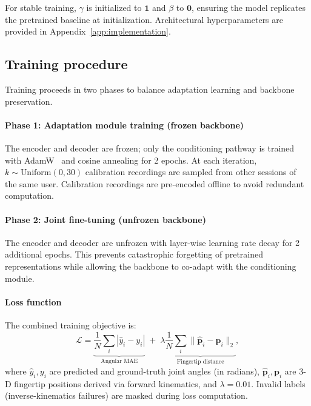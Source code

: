 \documentclass[conference]{IEEEtran}
\begin{document}
For stable training, $\gamma$ is initialized to $\mathbf{1}$ and $\beta$ to $\mathbf{0}$, ensuring the model replicates the pretrained baseline at initialization. Architectural hyperparameters are provided in Appendix~\ref{app:implementation}.

\subsection{Training procedure}
\label{sec:training}

Training proceeds in two phases to balance adaptation learning and backbone preservation.

\paragraph{Phase 1: Adaptation module training (frozen backbone)}
The encoder and decoder are frozen; only the conditioning pathway is trained with AdamW~\cite{loshchilov2019decoupled} and cosine annealing for 2 epochs. At each iteration, $k \sim \text{Uniform}(0, 30)$ calibration recordings are sampled from other sessions of the same user. Calibration recordings are pre-encoded offline to avoid redundant computation.

\paragraph{Phase 2: Joint fine-tuning (unfrozen backbone)}
The encoder and decoder are unfrozen with layer-wise learning rate decay for 2 additional epochs. This prevents catastrophic forgetting of pretrained representations while allowing the backbone to co-adapt with the conditioning module.

\paragraph{Loss function}
The combined training objective is:
\begin{equation}
    \mathcal{L} = \underbrace{\frac{1}{N}\sum_{i} |\hat{y}_i - y_i|}_{\text{Angular MAE}} \;+\; \lambda \underbrace{\frac{1}{N}\sum_{i} \|\hat{\mathbf{p}}_i - \mathbf{p}_i\|_2}_{\text{Fingertip distance}},
    \label{eq:loss}
\end{equation}
where $\hat{y}_i, y_i$ are predicted and ground-truth joint angles (in radians), $\hat{\mathbf{p}}_i, \mathbf{p}_i$ are 3-D fingertip positions derived via forward kinematics, and $\lambda = 0.01$. Invalid labels (inverse-kinematics failures) are masked during loss computation.
\end{document}
